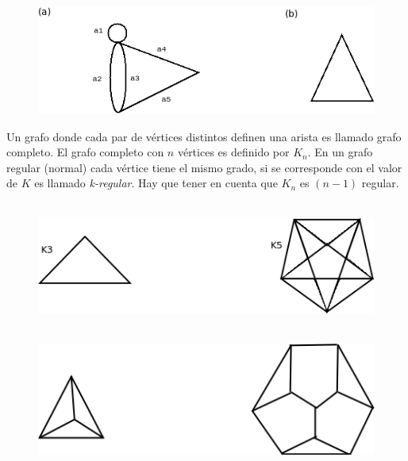 \documentclass[10pt,a5paper]{book}
\begin{document}
\begin{figure}[H]
  \centering
  \caption{ }
  \hrulefill{}\\
  \includegraphics[scale=0.5]{Figura1_2.png}
\end{figure}
\hrulefill{}\newline
Un grafo donde cada par de vértices distintos definen una arista es llamado grafo completo. El grafo completo con $n$ vértices es definido por $K_n$. En un grafo regular (normal) cada vértice tiene el mismo grado, si se corresponde con el valor de $K$ es llamado \emph{k-regular}. Hay que tener en cuenta que $K_n$ es $(n-1)$ regular.\newline

\begin{figure}[H]
  \centering
  \caption{ }
  \hrulefill{}\\
  \includegraphics[scale=0.47]{Figura1_3.png}
\end{figure}
\begin{figure}[H]
  \centering
  \caption{ }
  \hrulefill{}\\
  \includegraphics[scale=0.45]{Figura1_4.png}
\end{figure}
\hrulefill{}\\
\end{document}

